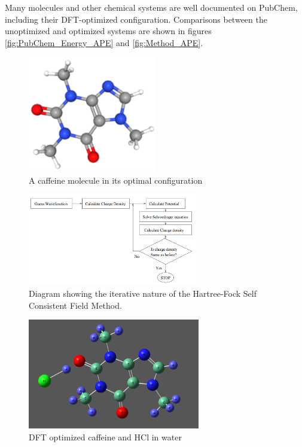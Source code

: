 \documentclass{report}
\begin{document}
            Many molecules and other chemical systems are well documented on PubChem, including their DFT-optimized configuration.  Comparisons between the unoptimized and optimized systems are shown in figures \ref{fig:PubChem_Energy_APE} and \ref{fig:Method_APE}.

            \begin{figure}[h!]
                \centering
                \includegraphics[width=0.5\textwidth]{images/Caffeine.png}
                \caption{A caffeine molecule in its optimal configuration}
                \label{fig:caffeine}
            \end{figure}

            \begin{figure}[h]
                \centering
                \includegraphics[width = 0.66\textwidth]{images/hartree_fock.png}
                \caption{Diagram\cite{scf} showing the iterative nature of the Hartree-Fock Self Consistent Field Method.}
                \label{fig:HFSCF}
            \end{figure}

            \begin{figure}[h]
                \centering
                \includegraphics[width=0.67\textwidth]{images/Optimized_Caffeine_HCl.png}
                \caption{DFT optimized caffeine and HCl in water}
                \label{fig:Optimized}
            \end{figure}
\end{document}
